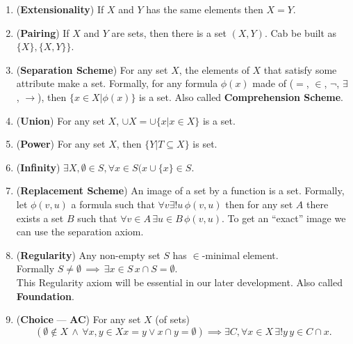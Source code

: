 \documentclass[11pt,pdftex,twoside,a4paper]{article}
\newcommand{\B}[1]{\textbf{#1}}
\theoremstyle{definition}
\begin{document}
\begin{enumerate}

\item (\B{Extensionality}) If $X$ and $Y$ has the same elements then \(X=Y\).

\item (\B{Pairing}) If $X$ and $Y$ are sets, then there is a set \((X, Y)\).
Cab be built as \(\{X\}, \{X,Y\}\}\).

\item (\B{Separation Scheme}) For any set $X$, the elements of $X$
that satisfy some attribute make a set.
Formally, for any formula \(\phi(x)\)
made of ($=$, $\in$, \(\neg\), \(\exists\), \(\rightarrow\)), then
\(\{x\in X | \phi(x)\}\) is a set.
Also called \B{Comprehension Scheme}.

\item (\B{Union}) For any set $X$, \(\cup X = \cup \{x|x\in X\}\) is a set.

\item (\B{Power}) For any set $X$, then \(\{Y| T\subseteq X\}\) is set.

\item (\B{Infinity})
  \(\exists X, \emptyset\in S, \forall x\in S (x\cup \{x\} \in S\).

\item (\B{Replacement Scheme}) An image of a set by a function is a set.
  Formally, let \(\phi(v,u)\) a formula
such that \(\forall v\exists!u\, \phi(v,u)\) then for any set $A$
there exists a set $B$ such that
 \(\forall v\in A \,\exists u\in B\, \phi(v,u)\).
To get an ``exact'' image we can use the separation axiom.

\item (\B{Regularity}) Any non-empty set $S$ has \(\in\)-minimal element.\\
Formally \(S\neq \emptyset \,\implies\, \exists x\in S\, x\cap S=\emptyset\).
\\
This Regularity axiom will be essential in our later development.
Also called \B{Foundation}.

\item (\B{Choice} --- \B{AC}) For any set $X$ (of sets)
\begin{equation*}
\left(\emptyset\notin X \,\land\,
  \forall x,y\in X x=y\lor x\cap y=\emptyset\right)
\implies
 \exists C, \forall x\in X\,\exists!y\, y\in C\cap x.
\end{equation*}
\end{enumerate}

\end{document}
